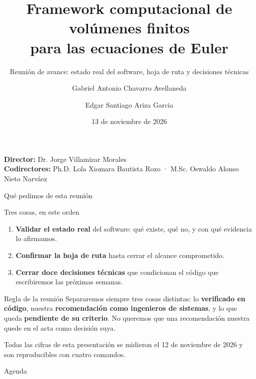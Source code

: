 \documentclass[aspectratio=169,10pt]{beamer}
\title[Framework FVM para Euler]{Framework computacional de volúmenes finitos\\
para las ecuaciones de Euler}
\subtitle{Reunión de avance: estado real del software, hoja de ruta y decisiones técnicas}
\author[Chavarro · Ariza]{Gabriel Antonio Chavarro Avellaneda \and Edgar Santiago Ariza Garcia}
\institute[UIS]{Escuela de Ingeniería de Sistemas e Informática\\Universidad Industrial de Santander}
\date{13 de noviembre de 2026}
\begin{document}
\begin{frame}[plain]
  \titlepage
  \begin{center}
    \small
    \textbf{Director:} Dr. Jorge Villamizar Morales\\
    \textbf{Codirectores:} Ph.D. Lola Xiomara Bautista Rozo · M.Sc. Oswaldo Alonso Nieto Narváez
  \end{center}
\end{frame}

\begin{frame}{Qué pedimos de esta reunión}

  \begin{block}{Tres cosas, en este orden}
    \begin{enumerate}
      \item \textbf{Validar el estado real} del software: qué existe, qué no, y
            con qué evidencia lo afirmamos.
      \item \textbf{Confirmar la hoja de ruta} hasta cerrar el alcance comprometido.
      \item \textbf{Cerrar doce decisiones técnicas} que condicionan el código que
            escribiremos las próximas semanas.
    \end{enumerate}
  \end{block}

  \begin{alertblock}{Regla de la reunión}
    Separaremos siempre tres cosas distintas: lo \textbf{verificado en código},
    nuestra \textbf{recomendación como ingenieros de sistemas}, y lo que queda
    \textbf{pendiente de su criterio}. No queremos que una recomendación nuestra
    quede en el acta como decisión suya.
  \end{alertblock}

  \begin{center}
    \small\color{gris}
    Todas las cifras de esta presentación se midieron el 12 de noviembre de 2026
    y son reproducibles con cuatro comandos.
  \end{center}
\end{frame}

\begin{frame}{Agenda}
  \tableofcontents
\end{frame}

\end{document}
